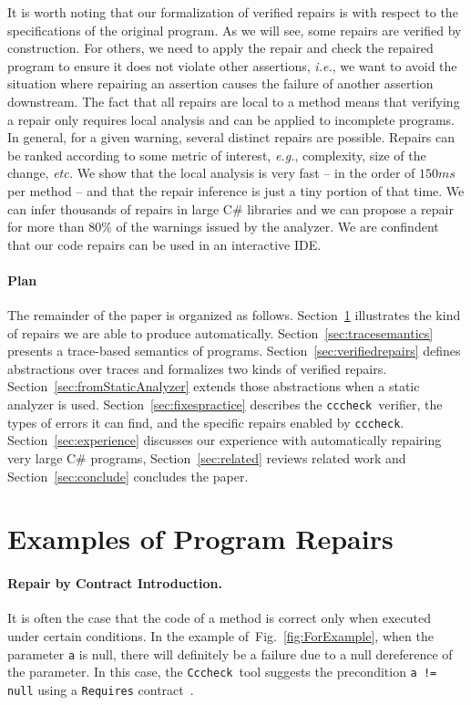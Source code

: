 \documentclass[10pt]{sigplanconf}
\newcommand{\refFig}[1]{Fig.~\ref{fig:#1}}
\newcommand{\code}[1]{\texttt{#1}}
\newcommand{\clousot}{\code{cccheck}}
\newcommand{\Clousot}{\code{Cccheck}}
\begin{document}
It is worth noting that our formalization of verified repairs is with
respect to the specifications of the original program. As we will see,
some repairs are verified by construction. For others, we need to
apply the repair and check the repaired program to ensure it does not
violate other assertions, \emph{i.e.}, we want to avoid the situation where repairing an assertion causes the failure of another assertion downstream.
The fact that all repairs are local to a method means that verifying a repair only requires
local analysis and can be applied to incomplete programs.
In general, for a given warning, several distinct repairs are possible.
Repairs can be ranked according to some metric of interest, \emph{e.g.}, complexity, size of the change, \emph{etc.}
We show that the local analysis is very fast -- in the order of $150ms$ per method -- and  that the repair inference is just a tiny portion of that time.
We can infer thousands of repairs in large C$\#$ libraries and we can propose a repair for more than $80\%$ of the warnings issued by the analyzer. 
We are confindent that our code repairs can be used in an interactive IDE.

\paragraph{Plan} The remainder of the paper is organized as
follows. Section~\ref{sec:examples} illustrates the kind of repairs we
are able to produce automatically.  Section~\ref{sec:tracesemantics}
presents a trace-based semantics of programs. 
Section~\ref{sec:verifiedrepairs} defines abstractions over traces and  formalizes two kinds of verified repairs.
Section~\ref{sec:fromStaticAnalyzer} extends those abstractions when a static analyzer is used.
Section~\ref{sec:fixespractice} describes the
\clousot\ verifier, the types of errors it can find, and the specific
repairs enabled by \clousot.  
Section~\ref{sec:experience} discusses our experience with automatically repairing very large C\# programs,
Section~\ref{sec:related} reviews related work and
Section~\ref{sec:conclude} concludes the paper.

\section{Examples of Program Repairs}
\label{sec:examples}

\paragraph{Repair by Contract Introduction.} 
It is often the case that the code of a method is correct only when
executed under certain conditions.  In the example
of~\refFig{ForExample}, when the parameter \code{a} is null, there
will definitely be a failure due to a null dereference of the
parameter.  In this case, the \Clousot\ tool suggests the precondition
\code{a != null} using a \code{Requires} contract~\cite{CousotCousotLogozzo-VMCAI11}.
\end{document}
